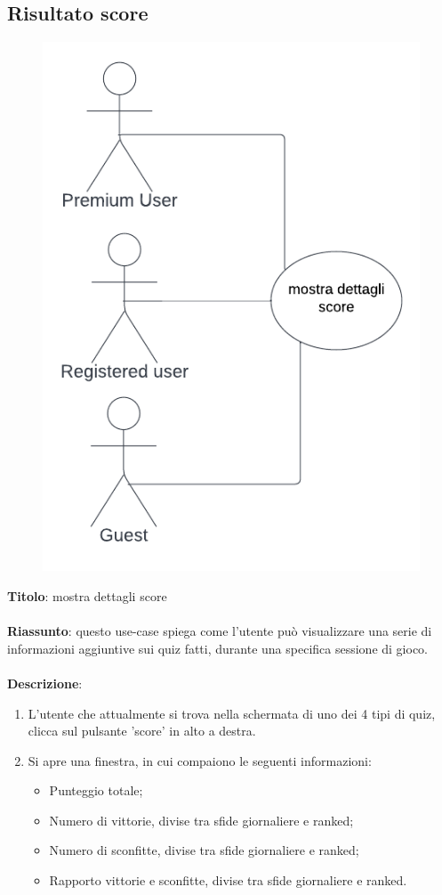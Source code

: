 \newpage
\subsection{Risultato score} \label{req_risultato_score}
\begin{figure}[!h]
\centering
\includegraphics[scale=0.35]{images/use_case_mostra_dettagli_score.png}
\end{figure}
\noindent
\textbf{Titolo}: mostra dettagli score \\
\\
\textbf{Riassunto}: questo use-case spiega come l'utente può visualizzare una serie di informazioni aggiuntive sui quiz fatti, durante una specifica sessione di gioco. \\
\\
\textbf{Descrizione}: 
\begin{enumerate}
    \item L'utente che attualmente si trova nella schermata di uno dei 4 tipi di quiz, clicca sul pulsante 'score' in alto a destra.
    \item Si apre una finestra, in cui compaiono le seguenti informazioni:
    \begin{itemize}
        \item Punteggio totale;
        \item Numero di vittorie, divise tra sfide giornaliere e ranked;
        \item Numero di sconfitte, divise tra sfide giornaliere e ranked;
        \item Rapporto vittorie e sconfitte, divise tra sfide giornaliere e ranked.
    \end{itemize}
\end{enumerate}

